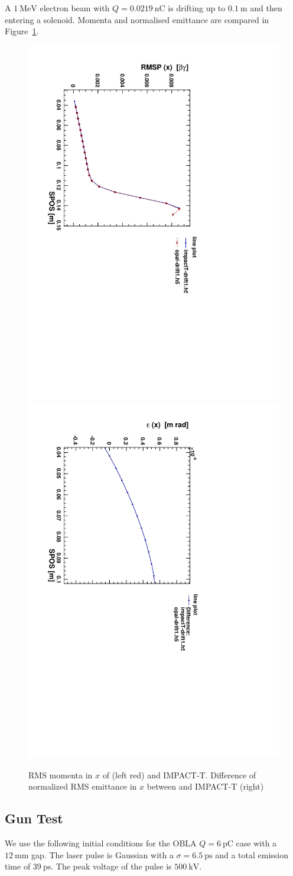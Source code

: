 \documentclass{psi-note}    %
\begin{document}
{A $1~\mbox{MeV}$ electron beam with $Q=0.0219 ~ \mbox{nC}$ is drifting up to
$0.1~\mbox{m}$ and then entering a solenoid. Momenta and normalised emittance
are compared in Figure~\ref{fig:dr-opal-1}. 
\begin{figure}[htbp]
\begin{center}
\includegraphics[width=.35\linewidth,angle=90]{figures/impactT-drift1-opal-drift1-RMSP-x-SPOS}
\includegraphics[width=.35\linewidth,angle=90]{figures/impactT-drift1-opal-drift1-varepsilon-x-SPOS}
\caption{RMS momenta in $x$ of \opalt (left red) and IMPACT-T. Difference of normalized RMS emittance in $x$ between \opalt  and IMPACT-T (right)}
\label{fig:dr-opal-1}
\end{center}
\end{figure}

\subsection{Gun Test}      \label{sec:Gun}   
We use the following initial conditions for the OBLA $Q=6 ~ \mbox{pC}$ case with
a $12~\mbox{mm}$ gap. The laser pulse is Gaussian with a $\sigma=6.5~\mbox{ps}$
and a total emission time of $39~\mbox{ps}$. The peak voltage of the pulse is
$500~\mbox{kV}$.
\clearpage
}
\end{document}
